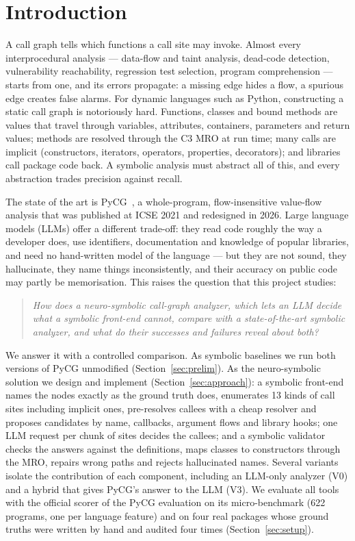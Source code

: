 \section{Introduction}
\label{sec:intro}

A call graph tells which functions a call site may invoke. Almost every
interprocedural analysis --- data-flow and taint analysis, dead-code detection,
vulnerability reachability, regression test selection, program comprehension
--- starts from one, and its errors propagate: a missing edge hides a flow, a
spurious edge creates false alarms. For dynamic languages such as Python,
constructing a static call graph is notoriously hard. Functions, classes and
bound methods are values that travel through variables, attributes, containers,
parameters and return values; methods are resolved through the C3 MRO at run
time; many calls are implicit (constructors, iterators, operators, properties,
decorators); and libraries call package code back. A symbolic analysis must
abstract all of this, and every abstraction trades precision against recall.

The state of the art is PyCG~\cite{salis2021pycg}, a whole-program,
flow-insensitive value-flow analysis that was published at ICSE 2021 and
redesigned in 2026. Large language models (LLMs) offer a different trade-off:
they read code roughly the way a developer does, use identifiers,
documentation and knowledge of popular libraries, and need no hand-written
model of the language --- but they are not sound, they hallucinate, they name
things inconsistently, and their accuracy on public code may partly be
memorisation. This raises the question that this project studies:

\begin{quote}
\emph{How does a neuro-symbolic call-graph analyzer, which lets an LLM decide
what a symbolic front-end cannot, compare with a state-of-the-art symbolic
analyzer, and what do their successes and failures reveal about both?}
\end{quote}

We answer it with a controlled comparison. As symbolic baselines we run both
versions of PyCG unmodified (Section~\ref{sec:prelim}). As the neuro-symbolic
solution we design and implement \nscg (Section~\ref{sec:approach}): a symbolic
front-end names the nodes exactly as the ground truth does, enumerates 13 kinds
of call sites including implicit ones, pre-resolves callees with a cheap
resolver and proposes candidates by name, callbacks, argument flows and
library hooks; one LLM request per chunk of sites decides the callees; and a
symbolic validator checks the answers against the definitions, maps classes to
constructors through the MRO, repairs wrong paths and rejects hallucinated
names. Several variants isolate the contribution of each component, including
an LLM-only analyzer (V0) and a hybrid that gives PyCG's answer to the LLM (V3).
We evaluate all tools with the official scorer of the PyCG evaluation on its
micro-benchmark (622 programs, one per language feature) and on four real
packages whose ground truths were written by hand and audited four times
(Section~\ref{sec:setup}).

